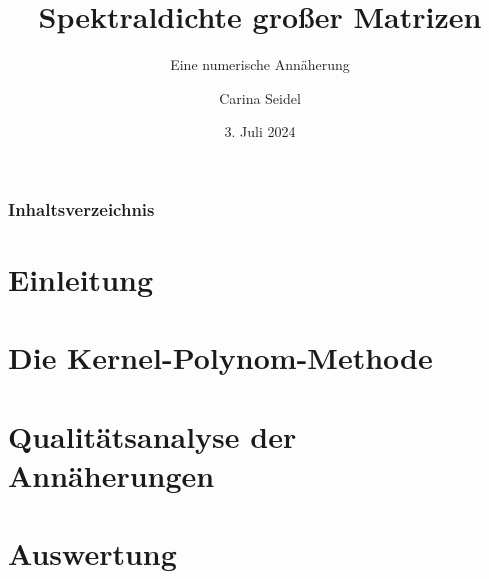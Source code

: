 \documentclass{beamer}
\title{Spektraldichte großer Matrizen}
\subtitle{Eine numerische Annäherung}
\author{Carina Seidel}
\institute[Universität Potsdam]{Universität Potsdam}
\date[3. Juli 2024]{3. Juli 2024}
\newcommand{\1}{\mathds{1}}
\begin{document}
\begin{frame}
\titlepage
\end{frame}
\begin{frame}
\frametitle{Inhaltsverzeichnis}
\tableofcontents
\end{frame}

\section{Einleitung}



\section{Die Kernel-Polynom-Methode}



\section{Qualitätsanalyse der Annäherungen}



\section{Auswertung}


\end{document}
